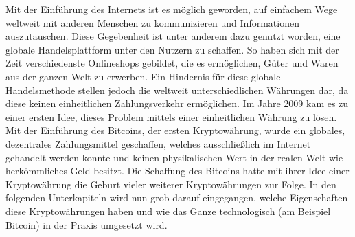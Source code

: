 Mit der Einführung des Internets ist es möglich geworden, auf einfachem Wege weltweit mit anderen Menschen zu kommunizieren und Informationen auszutauschen. Diese Gegebenheit ist unter anderem dazu genutzt worden, eine globale Handelsplattform unter den Nutzern zu schaffen. So haben sich mit der Zeit verschiedenste Onlineshops gebildet, die es ermöglichen, Güter und Waren aus der ganzen Welt zu erwerben. Ein Hindernis für diese globale Handelsmethode stellen jedoch die weltweit unterschiedlichen Währungen dar, da diese keinen einheitlichen Zahlungsverkehr ermöglichen. Im Jahre 2009 kam es zu einer ersten Idee, dieses Problem mittels einer einheitlichen Währung zu lösen. Mit der Einführung des Bitcoins, der ersten Kryptowährung, wurde ein globales, dezentrales Zahlungsmittel geschaffen, welches ausschließlich im Internet gehandelt werden konnte und keinen physikalischen Wert in der realen Welt wie herkömmliches Geld besitzt. Die Schaffung des Bitcoins hatte mit ihrer Idee einer Kryptowährung die Geburt vieler weiterer Kryptowährungen zur Folge. In den folgenden Unterkapiteln wird nun grob darauf eingegangen, welche Eigenschaften diese Kryptowährungen haben und wie das Ganze technologisch (am Beispiel Bitcoin) in der Praxis umgesetzt wird.